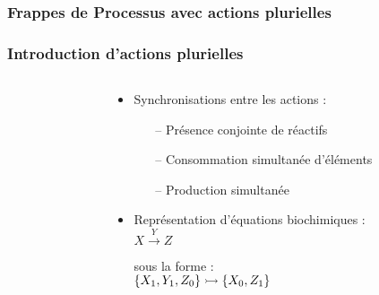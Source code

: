 
\begin{frame}[c]
  \frametitle{Frappes de Processus avec actions plurielles}


\end{frame}



\begin{frame}[c]
  \frametitle{Introduction d'actions plurielles}

\begin{columns}
\begin{column}{.4\textwidth}


\end{column}
\begin{column}{.55\textwidth}
\begin{center}

\begin{itemize}
  \item Synchronisations entre les actions :
  \begin{itemize}
    \item[--] Présence conjointe de réactifs
    \item[--] Consommation simultanée d'éléments
    \item[--] Production simultanée
  \end{itemize}
  \item Représentation d'équations biochimiques :\\
    \centering $X \xrightarrow{Y} Z$\\
    \raggedright sous la forme :\\
    \centering $\mbox{$\{X_1, Y_1, Z_0\} \rightarrowtail \{X_0, Z_1\}$}$
\end{itemize}


\end{center}
\end{column}
\end{columns}
\end{frame}
